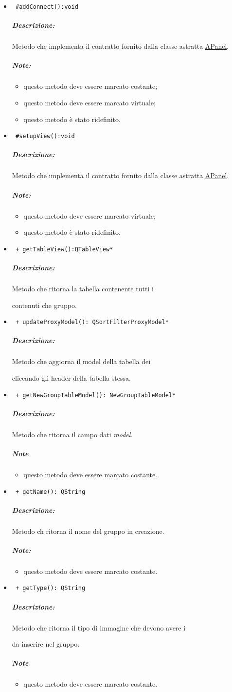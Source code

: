 \begin{itemize}
\item \color{blue}\verb! #addConnect():void!
\color{black}
\subparagraph{Descrizione:} Metodo che implementa il contratto fornito dalla classe astratta \hyperref[speAPanel]{APanel}.
 \subparagraph{Note:}
 \begin{itemize}
 \item questo metodo deve essere marcato costante;
 \item questo metodo deve essere marcato virtuale;
 \item questo metodo è stato ridefinito.
 \end{itemize}
\item \color{blue}\verb! #setupView():void!
\color{black}
\subparagraph{Descrizione:}
Metodo che implementa il contratto fornito dalla classe astratta \hyperref[speAPanel]{APanel}.\\
 \subparagraph{Note:}
 \begin{itemize}
 \item questo metodo deve essere marcato virtuale;
 \item questo metodo è stato ridefinito.
 \end{itemize}
\item \color{blue}\verb! + getTableView():QTableView*!
\color{black} 
\subparagraph{Descrizione:} Metodo che ritorna la tabella contenente tutti i \subject{} contenuti che gruppo.
\item \color{blue}\verb! + updateProxyModel(): QSortFilterProxyModel*!
\color{black} 
\subparagraph{Descrizione:} Metodo che aggiorna il model della tabella dei \subject{} cliccando gli header della tabella stessa.
\item \color{blue}\verb! + getNewGroupTableModel(): NewGroupTableModel*!
\color{black} 
\subparagraph{Descrizione:}Metodo che ritorna il campo dati \emph{model}. 
\subparagraph{Note}
 \begin{itemize}
 \item questo metodo deve essere marcato costante.
 \end{itemize}
\item \color{blue}\verb! + getName(): QString!
\color{black} 
\subparagraph{Descrizione:}Metodo ch ritorna il nome del gruppo in creazione.
\subparagraph{Note:}
 \begin{itemize}
 \item questo metodo deve essere marcato costante.
 \end{itemize}
\item \color{blue}\verb! + getType(): QString!
\color{black} 
\subparagraph{Descrizione:}Metodo che ritorna il tipo di immagine che devono avere i \subject{} da inserire nel gruppo. 
\subparagraph{Note}
 \begin{itemize}
 \item questo metodo deve essere marcato costante.
 \end{itemize}


\end{itemize}
